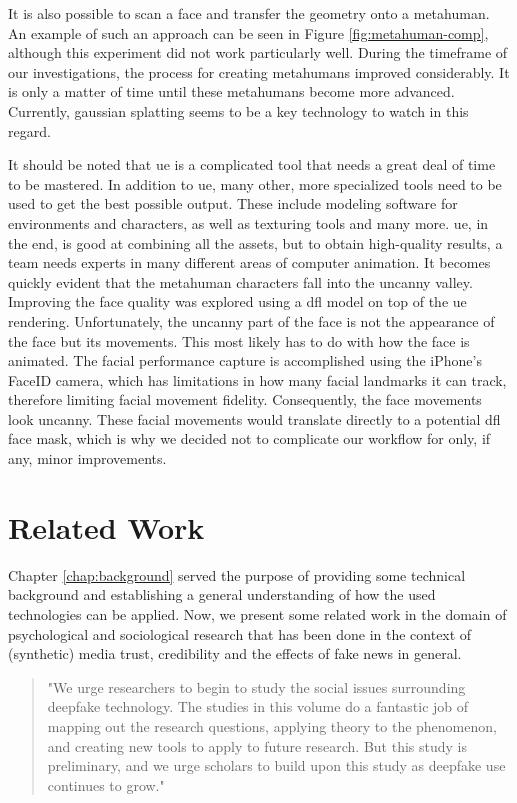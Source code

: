 \documentclass[
  a4paper,  %
  twoside,  %
  bibliography=totoc,
  headsepline,
  cleardoublepage=empty,
  parskip=half,
  draft=false
]{scrbook}
\begin{document}
It is also possible to scan a face and transfer the geometry onto a metahuman. An example of such an approach can be seen in Figure \ref{fig:metahuman-comp}, although this experiment did not work particularly well. During the timeframe of our investigations, the process for creating metahumans improved considerably. It is only a matter of time until these metahumans become more advanced. Currently, gaussian splatting seems to be a key technology to watch in this regard.

It should be noted that \gls{ue} is a complicated tool that needs a great deal of time to be mastered. In addition to \gls{ue}, many other, more specialized tools need to be used to get the best possible output. These include modeling software for environments and characters, as well as texturing tools and many more. \gls{ue}, in the end, is good at combining all the assets, but to obtain high-quality results, a team needs experts in many different areas of computer animation. It becomes quickly evident that the metahuman characters fall into the uncanny valley. Improving the face quality was explored using a \gls{dfl} model on top of the \gls{ue} rendering. Unfortunately, the uncanny part of the face is not the appearance of the face but its movements. This most likely has to do with how the face is animated. The facial performance capture is accomplished using the iPhone's FaceID camera, which has limitations in how many facial landmarks it can track, therefore limiting facial movement fidelity. Consequently, the face movements look uncanny. These facial movements would translate directly to a potential \gls{dfl} face mask, which is why we decided not to complicate our workflow for only, if any, minor improvements.

\chapter{Related Work}
\label{chap:rel-work}
Chapter \ref{chap:background} served the purpose of providing some technical background and establishing a general understanding of how the used technologies can be applied. Now, we present some related work in the domain of psychological and sociological research that has been done in the context of (synthetic) media trust, credibility and the effects of fake news in general. 

\begin{quotation}
  "We urge researchers to begin to study the social issues surrounding deepfake technology. The studies in this volume do a fantastic job of mapping out the research questions, applying theory to the phenomenon, and creating new tools to apply to future research. But this study is preliminary, and we urge scholars to build upon this study as deepfake use continues to grow." \cite{hancockSocialImpactDeepfakes2021}
\end{quotation}
\end{document}
